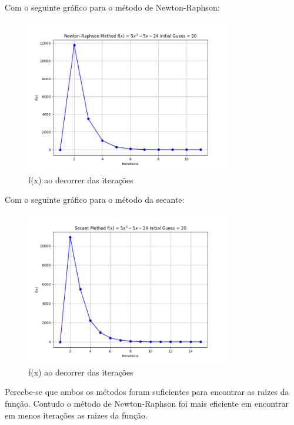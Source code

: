 \documentclass[12pt, a4paper]{article} %
\begin{document}
            Com o seguinte gr\'afico para o m\'etodo de Newton-Raphson:
            \begin{figure}[H]
                \centering
                \includegraphics[width=0.8\textwidth]{../images/grafic-ex-2.2-newton-raphson-method-20.png}
                \caption{f(x) ao decorrer das itera\c{c}\~oes}
            \end{figure}
            Com o seguinte gr\'afico para o m\'etodo da secante:
            \begin{figure}[H]
                \centering
                \includegraphics[width=0.8\textwidth]{../images/grafic-ex-2.2-secant-method-20.png}
                \caption{f(x) ao decorrer das itera\c{c}\~oes}
            \end{figure}

            Percebe-se que ambos os m\'etodos foram suficientes para encontrar as raizes da fun\c{c}\~ao. Contudo o m\'etodo de Newton-Raphson foi mais eficiente em encontrar em menos itera\c{c}\~oes as raizes da fun\c{c}\~ao.
\end{document}
